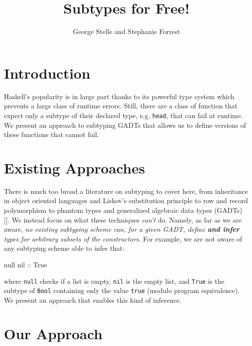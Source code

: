 \documentclass[]{article}
\title{Subtypes for Free!}
\author{George Stelle and Stephanie Forrest}
\date{}
\newenvironment{Shaded}{}{}
\newcommand{\DataTypeTok}[1]{\textcolor[rgb]{0.56,0.13,0.00}{{#1}}}
\newcommand{\OtherTok}[1]{\textcolor[rgb]{0.00,0.44,0.13}{{#1}}}
\newcommand{\NormalTok}[1]{{#1}}
\begin{document}
\maketitle

\section{Introduction}\label{introduction}

Haskell's popularity is in large part thanks to its powerful type system
which prevents a large class of runtime errors. Still, there are a class
of function that expect only a subtype of their declared type, e.g.
\texttt{head}, that can fail at runtime. We present an approach to
subtyping GADTs that allows us to define versions of these functions
that cannot fail.

\section{Existing Approaches}\label{existing-approaches}

There is much too broad a literature on subtyping to cover here, from
inheritance in object oriented languages and Liskov's substitution
principle \cite{liskov1994behavioral} to row and record polymorphism to
phantom types and generalized algebraic data types (GADTs)
{[}\cite{odersky2004overview,
leroy2014ocaml}{]}. We instead focus on what these techniques
\emph{can't} do. Namely, as far as we are aware, \emph{no existing
subtyping scheme can, for a given GADT, define \textbf{and infer} types
for arbitrary subsets of the constructors}. For example, we are not
aware of any subtyping scheme able to infer that:

\begin{Shaded}
\begin{Highlighting}[]
   \NormalTok{null}\OtherTok{ nil ::} \DataTypeTok{True}
\end{Highlighting}
\end{Shaded}

where \texttt{null} checks if a list is empty, \texttt{nil} is the empty
list, and \texttt{True} is the subtype of \texttt{Bool} containing only
the value \texttt{true} (modulo program equivalence). We present an
approach that enables this kind of inference.

\section{Our Approach}\label{our-approach}
\end{document}
